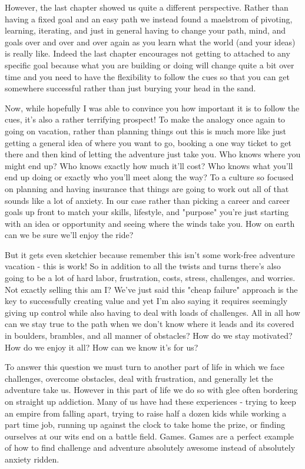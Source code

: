 \documentclass[11pt,a5paper]{book}
\begin{document}
However, the last chapter showed us quite a different perspective. Rather than having a fixed goal and an easy path we instead found a maelstrom of pivoting, learning, iterating, and just in general having to change your path, mind, and goals over and over and over again as you learn what the world (and your ideas) is really like. Indeed the last chapter encourages not getting to attached to any specific goal because what you are building or doing will change quite a bit over time and you need to have the flexibility to follow the cues so that you can get somewhere successful rather than just burying your head in the sand. 
\newline

Now, while hopefully I was able to convince you how important it is to follow the cues, it's also a rather terrifying prospect! To make the analogy once again to going on vacation, rather than planning things out this is much more like just getting a general idea of where you want to go, booking a one way ticket to get there and then kind of letting the adventure just take you. Who knows where you might end up? Who knows exactly how much it'll cost? Who knows what you'll end up doing or exactly who you'll meet along the way? To a culture so focused on planning and having insurance that things are going to work out all of that sounds like a lot of anxiety. In our case rather than picking a career and career goals up front to match your skills, lifestyle, and "purpose" you're just starting with an idea or opportunity and seeing where the winds take you. How on earth can we be sure we'll enjoy the ride?
\newline

But it gets even sketchier because remember this isn't some work-free adventure vacation - this is work! So in addition to all the twists and turns there's also going to be a lot of hard labor, frustration, costs, stress, challenges, and worries. Not exactly selling this am I? We've just said this "cheap failure" approach is the key to successfully creating value and yet I'm also saying it requires seemingly giving up control while also having to deal with loads of challenges. All in all how can we stay true to the path when we don't know where it leads and its covered in boulders, brambles, and all manner of obstacles? How do we stay motivated? How do we enjoy it all? How can we know it's for us?
\newline

To answer this question we must turn to another part of life in which we face challenges, overcome obstacles, deal with frustration, and generally let the adventure take us. However in this part of life we do so with glee often bordering on straight up addiction. Many of us have had these experiences - trying to keep an empire from falling apart, trying to raise half a dozen kids while working a part time job, running up against the clock to take home the prize, or finding ourselves at our wits end on a battle field. Games. Games are a perfect example of how to find challenge and adventure absolutely awesome instead of absolutely anxiety ridden. 
\newline
\end{document}
